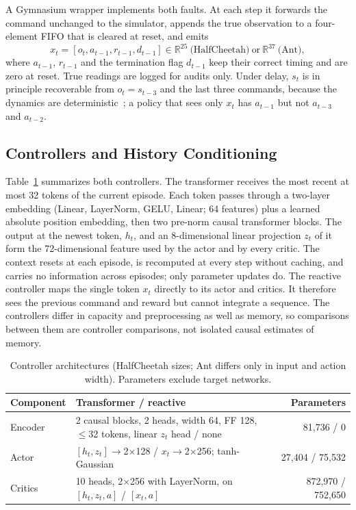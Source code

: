 \documentclass[runningheads]{llncs}
\begin{document}
A Gymnasium wrapper implements both faults. At each step it forwards the command unchanged to the simulator, appends the true observation to a four-element FIFO that is cleared at reset, and emits
\begin{equation}
 x_t=[o_t,a_{t-1},r_{t-1},d_{t-1}]\in\mathbb{R}^{25}\ \text{(HalfCheetah)}\ \text{or}\ \mathbb{R}^{37}\ \text{(Ant)},
 \label{eq:input}
\end{equation}
where $a_{t-1}$, $r_{t-1}$ and the termination flag $d_{t-1}$ keep their correct timing and are zero at reset. True readings are logged for audits only. Under delay, $s_t$ is in principle recoverable from $o_t=s_{t-3}$ and the last three commands, because the dynamics are deterministic~\cite{signaldelay}; a policy that sees only $x_t$ has $a_{t-1}$ but not $a_{t-3}$ and $a_{t-2}$.

\subsection{Controllers and History Conditioning}
Table~\ref{tab:arch} summarizes both controllers. The transformer receives the most recent at most 32 tokens of the current episode. Each token passes through a two-layer embedding (Linear, LayerNorm, GELU, Linear; 64 features) plus a learned absolute position embedding, then two pre-norm causal transformer blocks. The output at the newest token, $h_t$, and an 8-dimensional linear projection $z_t$ of it form the 72-dimensional feature used by the actor and by every critic. The context resets at each episode, is recomputed at every step without caching, and carries no information across episodes; only parameter updates do. The reactive controller maps the single token $x_t$ directly to its actor and critics. It therefore sees the previous command and reward but cannot integrate a sequence. The controllers differ in capacity and preprocessing as well as memory, so comparisons between them are controller comparisons, not isolated causal estimates of memory.

\begin{table}[t]
\caption{Controller architectures (HalfCheetah sizes; Ant differs only in input and action width). Parameters exclude target networks.}
\label{tab:arch}
\centering\small
\begin{tabular}{@{}p{}p{}r@{}}
\toprule
Component & Transformer / reactive & Parameters \\
\midrule
Encoder & 2 causal blocks, 2 heads, width 64, FF 128, $\le$32 tokens, linear $z_t$ head / none & 81{,}736 / 0 \\
Actor & $[h_t,z_t]\!\to$2$\times$128 / $x_t\!\to$2$\times$256; tanh-Gaussian & 27{,}404 / 75{,}532 \\
Critics & 10 heads, 2$\times$256 with LayerNorm, on $[h_t,z_t,a]$ / $[x_t,a]$ & 872{,}970 / 752{,}650 \\
\bottomrule
\end{tabular}
\end{table}
\end{document}
